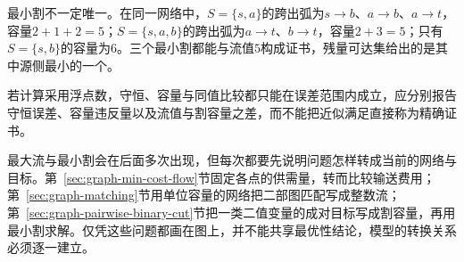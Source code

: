 最小割不一定唯一。在同一网络中，$S=\{s,a\}$的跨出弧为$s\to b$、$a\to b$、$a\to t$，容量$2+1+2=5$；$S=\{s,a,b\}$的跨出弧为$a\to t$、$b\to t$，容量$2+3=5$；只有$S=\{s,b\}$的容量为$6$。三个最小割都能与流值$5$构成证书，残量可达集给出的是其中源侧最小的一个。

若计算采用浮点数，守恒、容量与同值比较都只能在误差范围内成立，应分别报告守恒误差、容量违反量以及流值与割容量之差，而不能把近似满足直接称为精确证书。

最大流与最小割会在后面多次出现，但每次都要先说明问题怎样转成当前的网络与目标。第~\ref{sec:graph-min-cost-flow}节固定各点的供需量，转而比较输送费用；第~\ref{sec:graph-matching}节用单位容量的网络把二部图匹配写成整数流；第~\ref{sec:graph-pairwise-binary-cut}节把一类二值变量的成对目标写成割容量，再用最小割求解。仅凭这些问题都画在图上，并不能共享最优性结论，模型的转换关系必须逐一建立。

